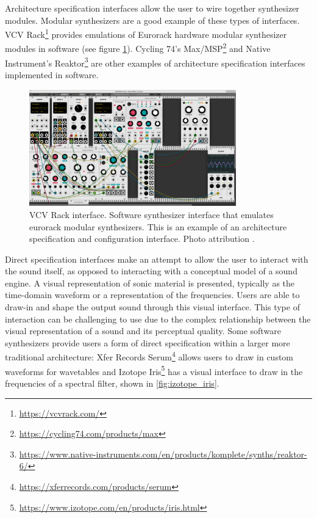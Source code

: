 Architecture specification interfaces allow the user to wire together synthesizer modules. Modular synthesizers are a good example of these types of interfaces. VCV Rack\footnote{\url{https://vcvrack.com/}} provides emulations of Eurorack \cite{intellijel2019} hardware modular synthesizer modules in software (see figure \ref{fig:vcv_rack}). Cycling 74's Max/MSP\footnote{\url{https://cycling74.com/products/max}} and Native Instrument's Reaktor\footnote{\url{https://www.native-instruments.com/en/products/komplete/synths/reaktor-6/}} are other examples of architecture specification interfaces implemented in software.

\begin{figure}[ht]
    \centering
    \includegraphics[width=0.8\textwidth]{figures/background/vcv_rack.png}
    \caption{VCV Rack interface. Software synthesizer interface that emulates eurorack modular synthesizers. This is an example of an architecture specification and configuration interface. Photo attribution \cite{popolon2018vcv}.}
    \label{fig:vcv_rack}
\end{figure}

Direct specification interfaces make an attempt to allow the user to interact with the sound itself, as opposed to interacting with a conceptual model of a sound engine. A visual representation of sonic material is presented, typically as the time-domain waveform or a representation of the frequencies. Users are able to draw-in and shape the output sound through this visual interface. This type of interaction can be challenging to use due to the complex relationship between the visual representation of a sound and its perceptual quality. Some software synthesizers provide users a form of direct specification within a larger more traditional architecture: Xfer Records Serum\footnote{\url{https://xferrecords.com/products/serum}} allows users to draw in custom waveforms for wavetables and Izotope Iris\footnote{\url{https://www.izotope.com/en/products/iris.html}} has a visual interface to draw in the frequencies of a spectral filter, shown in \ref{fig:izotope_iris}. 

